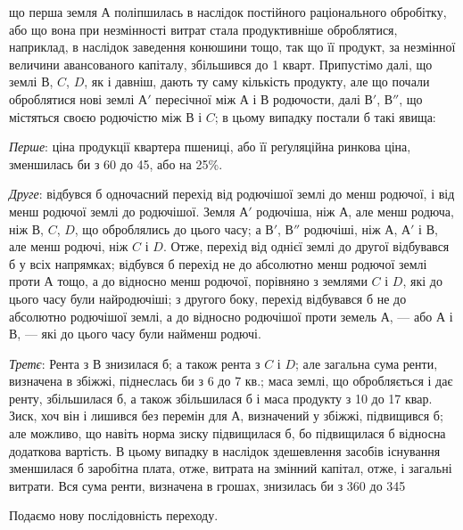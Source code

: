 \parcont{}  %
що перша земля $А$ поліпшилась в наслідок постійного раціонального обробітку,
або що вона при незмінності витрат стала продуктивніше оброблятися,
наприклад, в наслідок заведення конюшини тощо, так що її продукт, за незмінної
величини авансованого капіталу, збільшився до 1 кварт. Припустімо
далі, що землі $В$, $C$, $D$, як і давніш, дають ту саму кількість продукту, але що
почали оброблятися нові землі $А'$ пересічної між $А$ і $В$ родючости, далі $В'$, $В''$, що
містяться своєю родючістю між $В$ і $C$; в цьому випадку постали б такі явища:

\emph{Перше}: ціна продукції квартера пшениці, або її реґуляційна ринкова
ціна, зменшилась би з 60 до 45, або на 25\%.

\emph{Друге}: відбувся б одночасний перехід від родючішої землі до менш
родючої, і від менш родючої землі до родючішої. Земля $А'$ родючіша, ніж $А$, але
менш родюча, ніж $В$, $C$, $D$, що оброблялись до цього часу; а $В'$, $В''$ родючіші, ніж
$А$, $А'$ і $В$, але менш родючі, ніж $C$ і $D$. Отже, перехід від однієї землі до другої
відбувався б у всіх напрямках; відбувся б перехід не до абсолютно
менш родючої землі проти $А$ тощо, а до відносно менш родючої, порівняно
з землями $C$ і $D$, які до цього часу були найродючіші; з другого боку, перехід
відбувався б не до абсолютно родючішої землі, а до відносно родючішої проти
земель $А$, — або $А$ і $В$, — які до цього часу були найменш родючі.

\emph{Третє}: Рента з $В$ знизилася б; а також рента з $C$ і $D$; але загальна
сума ренти, визначена в збіжжі, піднеслась би з 6 до 7 кв.; маса землі, що
обробляється і дає ренту, збільшилася б, а також збільшилася б і маса продукту
з 10 до 17 квар. Зиск, хоч він і лишився без перемін для $А$, визначений у
збіжжі, підвищився б; але можливо, що навіть норма зиску підвищилася б, бо
підвищилася б відносна додаткова вартість. В цьому випадку в наслідок здешевлення
засобів існування зменшилася б заробітна плата, отже, витрата на змінний капітал,
отже, і загальні витрати. Вся сума ренти, визначена в грошах, знизилась би з 360 до 345

Подаємо нову послідовність переходу.

